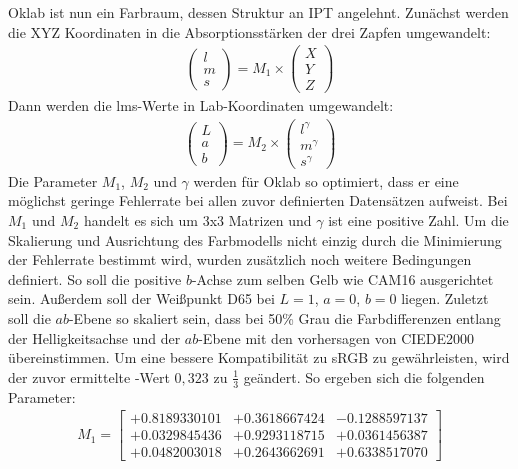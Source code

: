\documentclass[12pt, a4paper, ngerman]{article}
\begin{document}
Oklab ist nun ein Farbraum, dessen Struktur an IPT angelehnt.
Zunächst werden die XYZ Koordinaten in die Absorptionsstärken der drei Zapfen umgewandelt:
\begin{equation}
  \begin{aligned}
    \begin{pmatrix} l \\ m \\ s \end{pmatrix} = M_1 \times \begin{pmatrix} X \\ Y \\ Z \end{pmatrix}
  \end{aligned}
\end{equation}
Dann werden die lms-Werte in Lab-Koordinaten umgewandelt:
\begin{equation}
  \begin{aligned}
    \begin{pmatrix} L \\ a \\ b \end{pmatrix} = M_2 \times \begin{pmatrix} l^{ \gamma } \\ m^{ \gamma } \\ s^{ \gamma } \end{pmatrix}
  \end{aligned}
\end{equation}
Die Parameter \(M_1\), \(M_2\) und \(\gamma\) werden für Oklab so optimiert, 
dass er eine möglichst geringe Fehlerrate bei allen zuvor definierten Datensätzen aufweist. 
Bei \(M_1\) und \(M_2\) handelt es sich um 3x3 Matrizen und \(\gamma\) ist eine positive Zahl. 
Um die Skalierung und Ausrichtung des Farbmodells nicht einzig durch die Minimierung der Fehlerrate bestimmt wird, wurden zusätzlich noch weitere Bedingungen definiert.
So soll die positive \(b\)-Achse zum selben Gelb wie CAM16 ausgerichtet sein. 
Außerdem soll der Weißpunkt D65 bei \(L=1\), \(a=0\), \(b=0\) liegen. 
Zuletzt soll die \(ab\)-Ebene so skaliert sein, dass bei 50\% Grau die Farbdifferenzen entlang der Helligkeitsachse und 
der \(ab\)-Ebene mit den vorhersagen von CIEDE2000 übereinstimmen. 
Um eine bessere Kompatibilität zu sRGB zu gewährleisten, wird der zuvor ermittelte \gamma-Wert \(0,323\) zu \(\frac{ 1 }{ 3 }\) geändert. 
So ergeben sich die folgenden Parameter:  
\begin{equation}
  \begin{aligned}
    M_1 = \begin{bmatrix} +0.8189330101 & +0.3618667424 & -0.1288597137 \\ +0.0329845436 & +0.9293118715 & +0.0361456387 \\ +0.0482003018 & +0.2643662691 & +0.6338517070 \end{bmatrix}  
  \end{aligned}
\end{equation}
\end{document}

